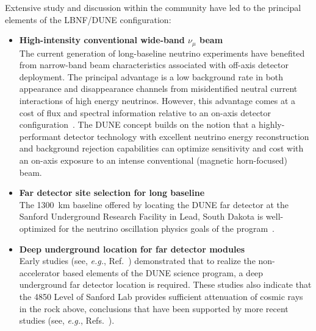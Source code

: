 Extensive study and discussion within the community
have led to the principal elements of the LBNF/DUNE
configuration:
\begin{itemize}
  \item {\bf\boldmath High-intensity conventional wide-band
  $\nu_\mu$ beam}\\
	The current generation of long-baseline neutrino experiments
	have benefited from narrow-band beam characteristics 
	associated with off-axis detector deployment. The principal 
	advantage is a low background rate in both \nue appearance 
	and \numu disappearance channels from misidentified neutral 
	current interactions of high energy neutrinos.  
	However, this advantage comes at a cost of flux and 
	spectral information relative to an on-axis detector 
    configuration~\cite{Adams:2013qkq,Agarwalla:2014tca}.
    The DUNE concept
    builds on the notion that a highly-performant detector
    technology with excellent neutrino energy reconstruction  and background rejection capabilities can
    optimize sensitivity and cost with an on-axis exposure to
    an intense conventional (magnetic horn-focused) beam.

  \item {\bf Far detector site selection for long baseline}\\
    The \SI{1300}{\km} baseline offered by locating the DUNE far detector
    at the Sanford Underground Research Facility in Lead, 
    South Dakota is well-optimized for the neutrino oscillation 
    physics goals of the program~\cite{Bass:2013vcg}.

  \item {\bf Deep underground location for far detector modules}\\
    Early studies (see, {\sl e.g.}, Ref.~\cite{homestake:depth}) 
    demonstrated that to realize the non-accelerator based elements
    of the DUNE science program, a deep underground far detector
    location is required.  These studies also indicate that the 
    4850 Level of Sanford Lab provides sufficient attenuation of 
    cosmic rays in the rock above, conclusions that have been 
    supported by more recent studies (see,
    {\sl e.g.}, Refs.~\cite{bib:docdb3384,bib:docdb1752}).


\end{itemize}
